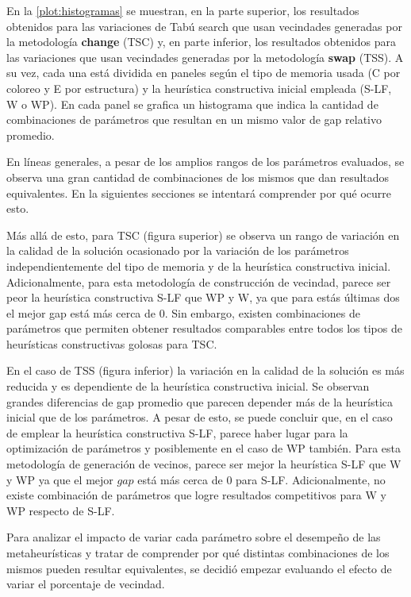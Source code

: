 En la \cref{plot:histogramas} se muestran, en la parte superior, los resultados obtenidos para las variaciones de Tabú search que usan vecindades generadas por la metodología \textbf{change} (TSC) y, en parte inferior, los resultados obtenidos para las variaciones que usan vecindades generadas por la metodología \textbf{swap} (TSS). A su vez, cada una está dividida en paneles según el tipo de memoria usada (C por coloreo y E por estructura) y la heurística constructiva inicial empleada (S-LF, W o WP). En cada panel se grafica un histograma que indica la cantidad de combinaciones de parámetros que resultan en un mismo valor de gap relativo promedio.

En líneas generales, a pesar de los amplios rangos de los parámetros evaluados, se observa una gran cantidad de combinaciones de los mismos que dan resultados equivalentes. En la siguientes secciones se intentará comprender por qué ocurre esto.

Más allá de esto, para TSC (figura superior) se observa un rango de variación en la calidad de la solución ocasionado por la variación de los parámetros independientemente del tipo de memoria y de la heurística constructiva inicial. Adicionalmente, para esta metodología de construcción de vecindad, parece ser peor la heurística constructiva S-LF que WP y W, ya que para estás últimas dos el mejor gap está más cerca de $0$. Sin embargo, existen combinaciones de parámetros que permiten obtener resultados comparables entre todos los tipos de heurísticas constructivas golosas para TSC.

En el caso de TSS (figura inferior) la variación en la calidad de la solución es más reducida y es dependiente de la heurística constructiva inicial. Se observan grandes diferencias de gap promedio que parecen depender más de la heurística inicial que de los parámetros. A pesar de esto, se puede concluir que, en el caso de emplear la heurística constructiva S-LF, parece haber lugar para la optimización de parámetros y posiblemente en el caso de WP también. Para esta metodología de generación de vecinos, parece ser mejor la heurística S-LF que W y WP ya que el mejor $gap$ está más cerca de 0 para S-LF. Adicionalmente, no existe combinación de parámetros que logre resultados competitivos para W y WP respecto de S-LF.

Para analizar el impacto de variar cada parámetro sobre el desempeño de las metaheurísticas y tratar de comprender por qué distintas combinaciones de los mismos pueden resultar equivalentes, se decidió empezar evaluando el efecto de variar el porcentaje de vecindad.

